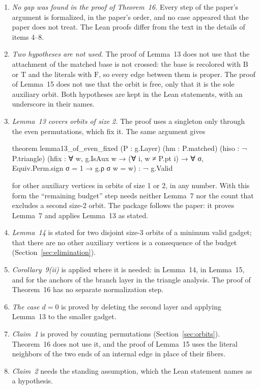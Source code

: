 \documentclass[11pt,a4paper]{article}
\newcommand{\T}{\mathrm{T}}
\newcommand{\F}{\mathrm{F}}
\newcommand{\B}{\mathrm{B}}
\begin{document}
\begin{enumerate}
\item \emph{No gap was found in the proof of Theorem~16.} Every step of the
paper's argument is formalized, in the paper's order, and no case appeared
that the paper does not treat. The Lean proofs differ from the text in the
details of items 4--8.
\item \emph{Two hypotheses are not used.} The proof of Lemma~13 does not use
that the attachment of the matched base is not crossed: the base is recolored
with $\B$ or $\T$ and the literals with $\F$, so every edge between them is
proper. The proof of Lemma~15 does not use that the orbit is free, only that
it is the sole auxiliary orbit. Both hypotheses are kept in the Lean
statements, with an underscore in their names.
\item \emph{Lemma~13 covers orbits of size 2.} The proof uses a singleton
only through the even permutations, which fix it. The same argument gives
\begin{code}
theorem lemma13_of_even_fixed (P : g.Layer) (hm : P.matched) (hiso : ¬ P.triangle)
    (hfix : ∀ w, g.IsAux w → (∀ i, w ≠ P.pt i) →
      ∀ σ, Equiv.Perm.sign σ = 1 → g.ρ σ w = w) : ¬ g.Valid
\end{code}
for other auxiliary vertices in orbits of size 1 or 2, in any number. With
this form the ``remaining budget'' step needs neither Lemma~7 nor the count
that excludes a second size-2 orbit. The package follows the paper: it
proves Lemma~7 and applies Lemma~13 as stated.
\item \emph{Lemma~14} is stated for two disjoint size-3 orbits of a minimum
valid gadget; that there are no other auxiliary vertices is a consequence of
the budget (Section~\ref{sec:elimination}).
\item \emph{Corollary~9(ii)} is applied where it is needed: in Lemma~14, in
Lemma~15, and for the anchors of the branch layer in the triangle analysis.
The proof of Theorem~16 has no separate normalization step.
\item \emph{The case $d=0$} is proved by deleting the second layer and
applying Lemma~13 to the smaller gadget.
\item \emph{Claim~1} is proved by counting permutations
(Section~\ref{sec:orbits}). Theorem~16 does not use it, and the proof of
Lemma~15 uses the literal neighbors of the two ends of an internal edge in
place of their fibers.
\item \emph{Claim~2} needs the standing assumption, which the Lean statement
names as a hypothesis.

\end{enumerate}
\end{document}
